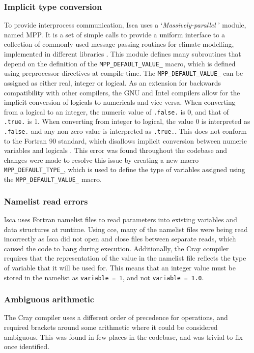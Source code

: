\documentclass[a4paper,11pt]{report}
\begin{document}
\subsubsection{Implicit type conversion}
To provide interprocess communication, Isca uses a `\textit{Massively-parallel} ' module, named MPP. It is a set of simple calls to provide a uniform interface to a collection of commonly used message-passing routines for climate modelling, implemented in different libraries \cite{balaji2002fms}. This module defines many subroutines that depend on the definition of the \texttt{MPP\_DEFAULT\_VALUE\_} macro, which is defined using preprocessor directives at compile time. The \texttt{MPP\_DEFAULT\_VALUE\_} can be assigned as either real, integer or logical. As an extension for backwards compatibility with other compilers, the GNU and Intel compilers allow for the implicit conversion of logicals to numericals and vice versa. When converting from a logical to an integer, the numeric value of \texttt{.false.} is 0, and that of \texttt{.true.} is 1. When converting from integer to logical, the value 0 is interpreted as \texttt{.false.} and any non-zero value is interpreted as \texttt{.true.}. This does not conform to the Fortran 90 standard, which disallows implicit conversion between numeric variables and logicals \cite{fortran1991standard,gnu2019conversion}. This error was found throughout the codebase and changes were made to resolve this issue by creating a new macro \texttt{MPP\_DEFAULT\_TYPE\_}, which is used to define the type of variables assigned using the \texttt{MPP\_DEFAULT\_VALUE\_} macro.

\subsubsection{Namelist read errors}
Isca uses Fortran namelist files to read parameters into existing variables and data structures at runtime. Using \gls{cce}, many of the namelist files were being read incorrectly as Isca did not open and close files between separate reads, which caused the code to hang during execution. Additionally, the Cray compiler requires that the representation of the value in the namelist file reflects the type of variable that it will be used for. This means that an integer value must be stored in the namelist as \texttt{variable = 1}, and not \texttt{variable = 1.0}.

\subsubsection{Ambiguous arithmetic}
The Cray compiler uses a different order of precedence for operations, and required brackets around some arithmetic where it could be considered ambiguous. This was found in few places in the codebase, and was trivial to fix once identified. 
\end{document}
